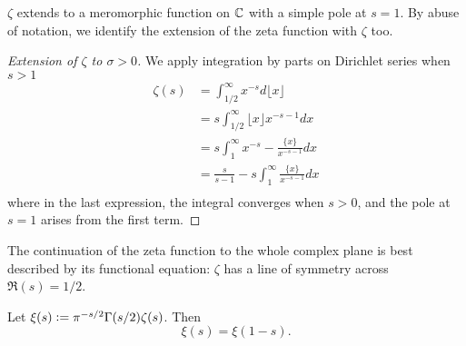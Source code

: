 \begin{proposition} \label{analyticcontinuation}
	$\zeta$ extends to a meromorphic function on $\mathbb{C}$ with a simple pole at $s=1$. By abuse of notation, we identify the extension of the zeta function with $\zeta$ too.
\end{proposition}
\begin{proof}[Extension of $\zeta$ to $\sigma>0$]
	We apply integration by parts on Dirichlet series when $s>1$ \begin{align*}
		\zeta(s)&=\int_{1/2}^{\infty} x^{-s} d \lfloor x \rfloor \\
				&= s \int_{1/2}^{\infty} \lfloor x \rfloor x^{-s-1} d x\\
				&=  s \int_{1}^{\infty}  x^{-s} - \frac{\{x\}}{x^{-s-1}} d x\\
				&= \frac{s}{s-1} - s \int_{1}^{\infty} \frac{\{x\}}{x^{-s-1}} dx\\
	\end{align*}
	where in the last expression, the integral converges when $s>0$, and the pole at $s=1$ arises from the first term.
\end{proof}
The continuation of the zeta function to the whole complex plane is best described by its functional equation: $\zeta$ has a line of symmetry across $\Re (s)=1/2$.
\begin{proposition}
	Let $\xi(s)\mathrel{\mathop:}= \pi^{-s/2}\Gamma(s/2)\zeta(s)$. Then \begin{equation}\label{symmetryeq}
		\xi(s) = \xi(1-s).
	\end{equation}
\end{proposition}
